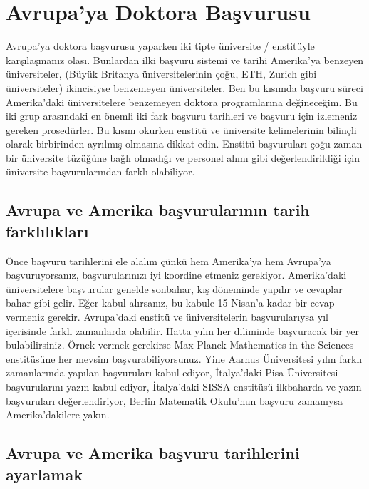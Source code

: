 \documentclass[12pt]{article}
\begin{document}
\section{Avrupa'ya Doktora Başvurusu}
Avrupa'ya doktora başvurusu yaparken iki tipte üniversite / enstitüyle karşılaşmanız olası. Bunlardan ilki başvuru sistemi ve tarihi Amerika'ya benzeyen üniversiteler, (Büyük Britanya üniversitelerinin çoğu, ETH, Zurich gibi üniversiteler) ikincisiyse benzemeyen üniversiteler. Ben bu kısımda başvuru süreci Amerika'daki üniversitelere benzemeyen doktora programlarına değineceğim. Bu iki grup arasındaki en önemli iki fark başvuru tarihleri ve başvuru için izlemeniz gereken prosedürler. Bu kısmı okurken enstitü ve üniversite kelimelerinin bilinçli olarak birbirinden ayrılmış olmasına dikkat edin. Enstitü başvuruları çoğu zaman bir üniversite tüzüğüne bağlı olmadığı ve personel alımı gibi değerlendirildiği için üniversite başvurularından farklı olabiliyor. 

\subsection{Avrupa ve Amerika başvurularının tarih farklılıkları}

Önce başvuru tarihlerini ele alalım çünkü hem Amerika'ya hem Avrupa'ya başvuruyorsanız, başvurularınızı iyi koordine etmeniz gerekiyor. Amerika'daki üniversitelere başvurular genelde sonbahar, kış döneminde yapılır ve cevaplar bahar gibi gelir. Eğer kabul alırsanız, bu kabule 15 Nisan'a kadar bir cevap vermeniz gerekir. Avrupa'daki enstitü ve üniversitelerin başvurularıysa yıl içerisinde farklı zamanlarda olabilir. Hatta yılın her diliminde başvuracak bir yer bulabilirsiniz. Örnek vermek gerekirse Max-Planck Mathematics in the Sciences enstitüsüne her mevsim başvurabiliyorsunuz. Yine Aarhus Üniversitesi yılın farklı zamanlarında yapılan başvuruları kabul ediyor, İtalya'daki Pisa Üniversitesi başvurularını yazın kabul ediyor, İtalya'daki SISSA enstitüsü ilkbaharda ve yazın başvuruları değerlendiriyor, Berlin Matematik Okulu'nun başvuru zamanıysa Amerika’dakilere yakın.

\subsection{Avrupa ve Amerika başvuru tarihlerini ayarlamak}
\end{document}
